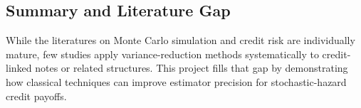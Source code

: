 \subsection{Summary and Literature Gap}

While the literatures on Monte Carlo simulation and credit risk are individually mature, few studies apply variance-reduction methods systematically to credit-linked notes or related structures. This project fills that gap by demonstrating how classical techniques can improve estimator precision for stochastic-hazard credit payoffs.
